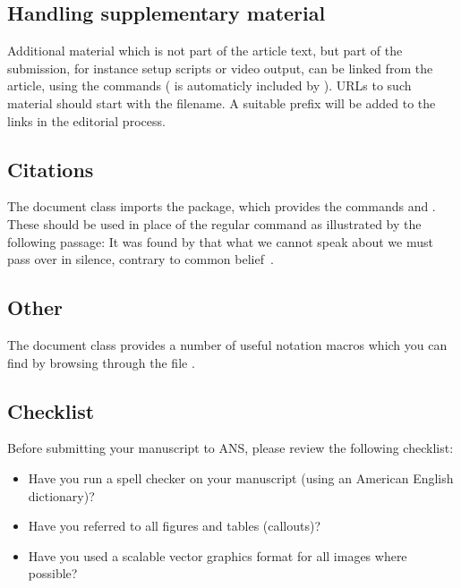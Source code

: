 \documentclass{ansarticle}
\begin{document}
\subsection{Handling supplementary material}

Additional material which is not part of the article text, but part of
the submission, for instance setup scripts or video output, can be
linked from the article, using the  commands
( is automaticly included by
). URLs to such material should start with the
filename. A suitable prefix will be added to the links in the
editorial process.

\subsection{Citations}

The  document class imports the  package,
which provides the commands  and
. These should be used in place of the
regular  command as illustrated by the
following passage: It was found by \citet{Wittgenstein1921} that what
we cannot speak about we must pass over in silence, contrary to common
belief~\citep{Newton1687}.

\subsection{Other}

The  document class provides a number of useful
notation macros which you can find by browsing through the file
.

\subsection{Checklist}


Before submitting your manuscript to ANS, please review the following
checklist:
\begin{itemize}
\item
  Have you run a spell checker on your manuscript (using an American English
  dictionary)?
\item
  Have you referred to all figures and tables (callouts)?
\item
  Have you used a scalable vector graphics format for all images where
  possible?
\end{itemize}
\end{document}
